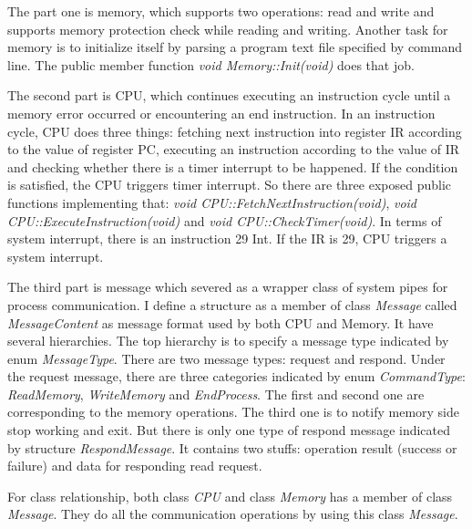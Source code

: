 \documentclass[a4paper]{report}
\begin{document}
The part one is memory, which supports two operations: read and write and supports memory protection check while reading and writing. Another task for memory is to initialize itself by parsing a program text file specified by command line. The public member function \textit{\color{blue} void Memory::Init(void)} does that job.

The second part is CPU, which continues executing an instruction cycle until a memory error occurred or encountering an end instruction. In an instruction cycle, CPU does three things: fetching next instruction into register IR according to the value of register PC, executing an instruction according to the value of IR and checking whether there is a timer interrupt to be happened. If the condition is satisfied, the CPU triggers timer interrupt. So there are three exposed public functions implementing that: \textit{\color{blue} void CPU::FetchNextInstruction(void)}, \textit{\color{blue} void CPU::ExecuteInstruction(void)} and \textit{\color{blue} void CPU::CheckTimer(void)}. In terms of system interrupt, there is an instruction 29 Int. If the IR is 29, CPU triggers a system interrupt.

The third part is message which severed as a wrapper class of system pipes for process communication. I define a structure as a member of class \textit{\color{blue} Message} called \textit{\color{blue} MessageContent} as message format used by both CPU and Memory. It have several hierarchies. The top hierarchy is to specify a message type indicated by enum \textit{\color{blue} MessageType}. There are two message types: request and respond. Under the request message, there are three categories indicated by enum \textit{\color{blue} CommandType}: \textit{\color{blue} ReadMemory}, \textit{\color{blue} WriteMemory} and \textit{\color{blue} EndProcess}. The first and second one are corresponding to the memory operations. The third one is to notify memory side stop working and exit. But there is only one type of respond message indicated by structure \textit{\color{blue} RespondMessage}. It contains two stuffs: operation result (success or failure) and data for responding read request.

For class relationship, both class \textit{\color{blue} CPU} and class \textit{\color{blue} Memory} has a member of class \textit{\color{blue} Message}. They do all the communication operations by using this class \textit{\color{blue} Message}.
\end{document}
